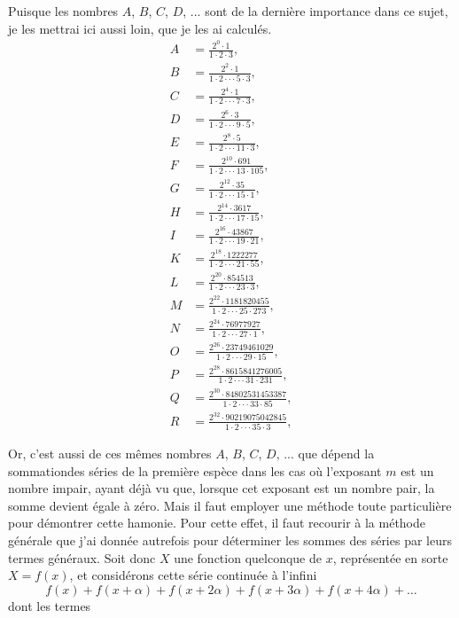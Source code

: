 \documentclass[12pt]{article}
\theoremstyle{definition}
\begin{document}
Puisque les nombres $A$, $B$, $C$, $D$, $...$ sont de la dernière importance dans ce sujet, je les mettrai ici aussi loin, que je les ai calculés.
\begin{align*}
    A &= \frac{2^0 \cdot 1}{1 \cdot 2 \cdot 3}, \\
    B &= \frac{2^2 \cdot 1}{1 \cdot 2 \cdot \cdot \cdot 5 \cdot 3}, \\
    C &= \frac{2^4 \cdot 1}{1 \cdot 2 \cdot \cdot \cdot 7 \cdot 3}, \\
    D &= \frac{2^6 \cdot 3}{1 \cdot 2 \cdot \cdot \cdot 9 \cdot 5}, \\
    E &= \frac{2^8 \cdot 5}{1 \cdot 2 \cdot \cdot \cdot 11 \cdot 3}, \\
    F &= \frac{2^{10} \cdot 691}{1 \cdot 2 \cdot \cdot \cdot 13 \cdot 105}, \\
    G &= \frac{2^{12} \cdot 35}{1 \cdot 2 \cdot \cdot \cdot 15 \cdot 1}, \\
    H &= \frac{2^{14} \cdot 3617}{1 \cdot 2 \cdot \cdot \cdot 17 \cdot 15}, \\
    I &= \frac{2^{16} \cdot 43867}{1 \cdot 2 \cdot \cdot \cdot 19 \cdot 21}, \\
    K &= \frac{2^{18} \cdot 1222277}{1 \cdot 2 \cdot \cdot \cdot 21 \cdot 55}, \\
    L &= \frac{2^{20} \cdot 854513}{1 \cdot 2 \cdot \cdot \cdot 23 \cdot 3}, \\
    M &= \frac{2^{22} \cdot 1181820455}{1 \cdot 2 \cdot \cdot \cdot 25 \cdot 273}, \\
    N &= \frac{2^{24} \cdot 76977927}{1 \cdot 2 \cdot \cdot \cdot 27 \cdot 1}, \\
    O &= \frac{2^{26} \cdot 23749461029}{1 \cdot 2 \cdot \cdot \cdot 29 \cdot 15}, \\
    P &= \frac{2^{28} \cdot 8615841276005}{1 \cdot 2 \cdot \cdot \cdot 31 \cdot 231}, \\
    Q &= \frac{2^{30} \cdot 84802531453387}{1 \cdot 2 \cdot \cdot \cdot 33 \cdot 85}, \\
    R &= \frac{2^{32} \cdot 90219075042845}{1 \cdot 2 \cdot \cdot \cdot 35 \cdot 3}, 
\end{align*} 

Or, c'est aussi de ces mêmes nombres $A$, $B$, $C$, $D$, $...$ que dépend la sommationdes séries de la première espèce dans les cas où l'exposant $m$ est un nombre impair, ayant déjà vu que, lorsque cet exposant est un nombre pair, la somme devient égale à zéro. Mais il faut employer une méthode toute particulière pour démontrer cette hamonie. Pour cette effet, il faut recourir à la méthode générale que j'ai donnée autrefois pour déterminer les sommes des séries par leurs termes généraux. Soit donc $X$ une fonction quelconque de $x$, représentée en sorte $X = f(x)$, et considérons cette série continuée à l'infini
$$f(x) + f(x + \alpha) + f(x + 2\alpha) + f(x + 3\alpha) + f(x + 4\alpha) + \dots$$
dont les termes 
\end{document}
